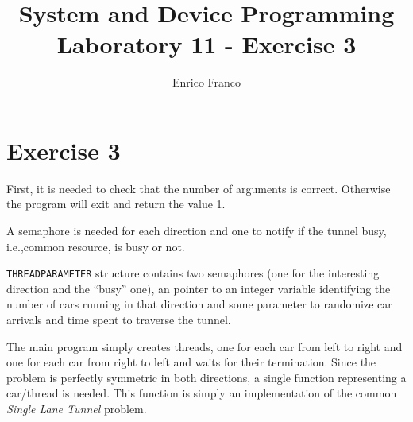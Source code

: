 \documentclass{report}
\author{Enrico Franco}
\title{System and Device Programming \\
	Laboratory 11 - Exercise 3}
\begin{document}
\section*{Exercise 3}
First, it is needed to check that the number of arguments is correct. Otherwise the program will exit and return the value 1.

A semaphore is needed for each direction and one to notify if the tunnel busy, i.e.,\@ common resource, is busy or not.

\texttt{THREADPARAMETER} structure contains two semaphores (one for the interesting direction and the ``busy'' one), an pointer to an  integer variable identifying the number of cars running in that direction and some parameter to randomize car arrivals and time spent to traverse the tunnel.

The main program simply creates threads, one for each car from left to right and one for each car from right to left and waits for their termination. Since the problem is perfectly symmetric in both directions, a single function representing a car/thread is needed. This function is simply an implementation of the common \emph{Single Lane Tunnel} problem.
\end{document}
